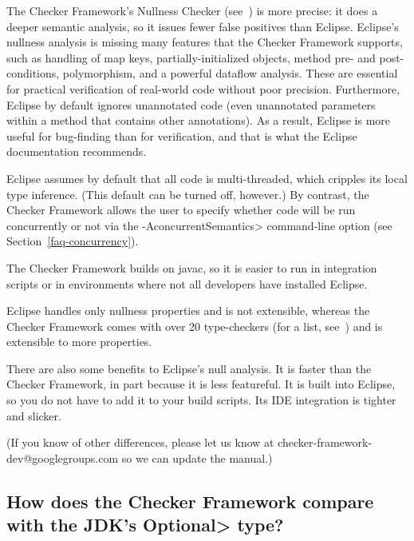 The Checker Framework's Nullness Checker
(see~) is more precise:  it does a deeper
semantic analysis, so it issues fewer false positives than Eclipse.
Eclipse's nullness analysis is missing many features that the Checker
Framework supports, such as handling of map keys, partially-initialized
objects, method pre- and post-conditions, polymorphism, and a powerful
dataflow analysis.  These are essential for practical verification of
real-world code without poor precision.
Furthermore, Eclipse by default ignores unannotated code (even unannotated
parameters within a method that contains other annotations).
As a result, Eclipse is more useful for bug-finding than for verification,
and that is what the Eclipse documentation recommends.

Eclipse assumes by default that all code is multi-threaded, which cripples its local
type inference.  (This default can be turned off, however.)
By contrast, the Checker Framework allows the user to
specify whether code will be run concurrently or not via the
\<-AconcurrentSemantics> command-line option (see
Section~\ref{faq-concurrency}).

The Checker Framework builds on javac, so it is easier to run in
integration scripts or in
environments where not all developers have installed Eclipse.

Eclipse handles only nullness properties and is not extensible, whereas the
Checker Framework comes with over 20 type-checkers (for a list,
see~) and is extensible to more properties.

There are also some benefits to Eclipse's null analysis.
It is faster than the Checker Framework, in part because it is less featureful.
It is built into Eclipse, so you do not have to add it to your build scripts.
Its IDE integration is tighter and slicker.

(If you know of other differences, please let us know at
checker-framework-dev@googlegroups.com so we can update the manual.)


\subsection{How does the Checker Framework compare with the JDK's \<Optional> type?\label{faq-optional}}

